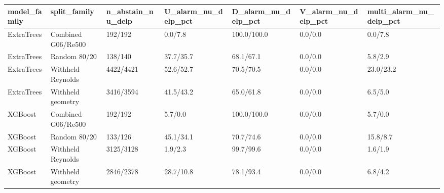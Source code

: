 \begin{tabular}{lllllll}
\hline
model_family & split_family & n_abstain_nu_delp & U_alarm_nu_delp_pct & D_alarm_nu_delp_pct & V_alarm_nu_delp_pct & multi_alarm_nu_delp_pct \\
\hline
ExtraTrees & Combined G06/Re500 & 192/192 & 0.0/7.8 & 100.0/100.0 & 0.0/0.0 & 0.0/7.8 \\
ExtraTrees & Random 80/20 & 138/140 & 37.7/35.7 & 68.1/67.1 & 0.0/0.0 & 5.8/2.9 \\
ExtraTrees & Withheld Reynolds & 4422/4421 & 52.6/52.7 & 70.5/70.5 & 0.0/0.0 & 23.0/23.2 \\
ExtraTrees & Withheld geometry & 3416/3594 & 41.5/43.2 & 65.0/61.8 & 0.0/0.0 & 6.5/5.0 \\
XGBoost & Combined G06/Re500 & 192/192 & 5.7/0.0 & 100.0/100.0 & 0.0/0.0 & 5.7/0.0 \\
XGBoost & Random 80/20 & 133/126 & 45.1/34.1 & 70.7/74.6 & 0.0/0.0 & 15.8/8.7 \\
XGBoost & Withheld Reynolds & 3125/3128 & 1.9/2.3 & 99.7/99.6 & 0.0/0.0 & 1.6/1.9 \\
XGBoost & Withheld geometry & 2846/2378 & 28.7/10.8 & 78.1/93.4 & 0.0/0.0 & 6.8/4.2 \\
\hline
\end{tabular}
